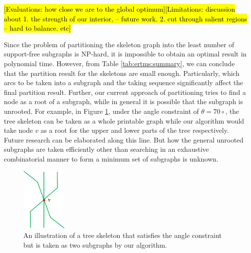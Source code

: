 \hl {[Evaluations: how close we are to the global optimum][Limitations: discussion about 1. the strength of our interior, -- future work. 2. cut through salient regions -- hard to balance. etc]} 

Since the problem of partitioning the skeleton graph into the least number of support-free subgraphs is NP-hard, it is impossible to obtain an optimal result in polynomial time. However, from Table \ref{tab:ertms:summary}, we can conclude that the partition result for the skeletons are small enough. Particularly, which arcs to be taken into a subgraph and the taking sequence significantly affect the final partition result. Further, our current approach of partitioning tries to find a node as a root of a subgraph, while in general it is possible that the subgraph is unrooted. For example, in Figure \ref{fig:unrooted}, under the angle constraint of $\theta = 70{\circ}$, the tree skeleton can be taken as a whole printable graph while our algorithm would take node $v$ as a root for the upper and lower parts of the tree respectively. Future research can be elaborated along this line. But how the general unrooted subgraphs are taken efficiently other than  searching in an exhaustive combinatorial manner to form a minimum set of subgraphs is unknown.

\begin{figure}[tbp]
  \centering
  \includegraphics[width=0.2\textwidth]{figs/unrooted.png}
  \caption{\label{fig:unrooted}%
           An illustration of a tree skeleton that satisfies the angle constraint but is taken as two subgraphs by our algorithm.}
\end{figure}


